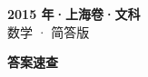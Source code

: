 \documentclass[zihao=-4, a4paper]{ctexart}
\begin{document}
\begin{center}
  {\Large\bfseries 2015 年·上海卷·文科}\\[4pt]
  {\large 数学 · 简答版}
\end{center}
\medskip
{}

\clearpage
{}
\begin{center}{\Large\bfseries 答案速查}\end{center}
\medskip

\end{document}
